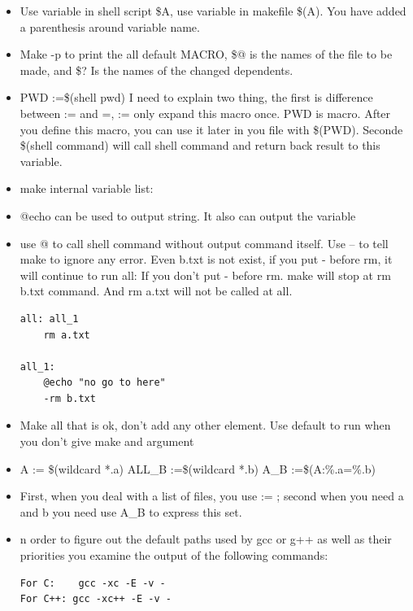 \documentclass[a4paper,11pt,twoside]{book}
\begin{document}
\begin{itemize}
		\item Use variable in shell script \$A, use variable in makefile \$(A). You have added a parenthesis around variable name.  
		
		\item Make -p to print the all default MACRO, \$@ is the names of the file to be made, and \$? Is the names of the changed dependents.

		\item PWD :=\$(shell pwd) I need to explain two thing, the first is difference between := and =, := only expand this macro once.    PWD is macro. After you define this macro, you can use it later in you file with \$(PWD). Seconde \$(shell command) will call shell command and return back result to this variable. 

\item make internal variable list:

		\item @echo can be used to output string. It also can output the variable

		\item use @ to call shell command without output command itself. Use – to tell make to ignore any error. Even b.txt is not exist, if you put - before rm, it will continue to run all: If you don't put - before rm. make will stop at rm b.txt command. And rm a.txt will not be called at all.  
\begin{verbatim}
all: all_1
	rm a.txt
	 
all_1:
	@echo "no go to here"
	-rm b.txt
\end{verbatim}		
		
		
		\item Make all that is ok, don't add any other element. Use default to run when you don't give make and argument

		\item A := \$(wildcard *.a)  ALL\_B :=\$(wildcard *.b)  A\_B :=\$(A:\%.a=\%.b)
		
		\item First, when you deal with a list of files, you use := ; second when you need a and b you need use A\_B to express this set.
		
		\item n order to figure out the default paths used by gcc or g++ as well as their priorities you examine the output of the following commands:
\begin{verbatim}
For C:    gcc -xc -E -v -
For C++: gcc -xc++ -E -v -
\end{verbatim}


\end{itemize}
\end{document}
